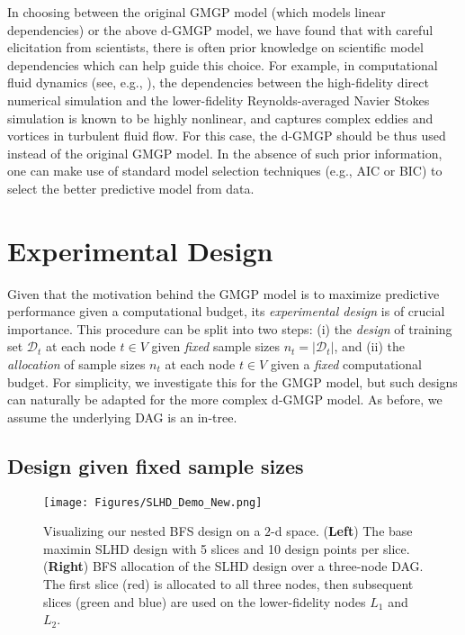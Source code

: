 \documentclass[12pt]{article}
\begin{document}
In choosing between the original GMGP model (which models linear dependencies) or the above d-GMGP model, we have found that with careful elicitation from scientists, there is often prior knowledge on scientific model dependencies which can help guide this choice. For example, in computational fluid dynamics (see, e.g., \citealp{wang2016swirling}), the dependencies between the high-fidelity direct numerical simulation \citep{pope2000turbulent} and the lower-fidelity Reynolds-averaged Navier Stokes simulation \citep{catalano2003evaluation} is known to be highly nonlinear, and captures complex eddies and vortices in turbulent fluid flow. For this case, the d-GMGP should be thus used instead of the original GMGP model. In the absence of such prior information, one can make use of standard model selection techniques (e.g., AIC or BIC) to select the better predictive model from data.

\section{Experimental Design}
\label{sec:Design}

Given that the motivation behind the GMGP model is to maximize predictive performance given a computational budget, its \textit{experimental design} is of crucial importance. This procedure can be split into two steps: (i) the \textit{design} of training set $\mathcal{D}_t$ at each node $t \in V$ given \textit{fixed} sample sizes $n_t = |\mathcal{D}_t|$, and (ii) the \textit{allocation} of sample sizes $n_t$ at each node $t \in V$ given a \textit{fixed} computational budget. For simplicity, we investigate this for the GMGP model, but such designs can naturally be adapted for the more complex d-GMGP model. As before, we assume the underlying DAG is an in-tree.

\subsection{Design given fixed sample sizes}
\label{sec:bfs}

\begin{figure}[!t]
    \centering
    \texttt{[image: Figures/SLHD\_Demo\_New.png]}
    \caption{Visualizing our nested BFS design on a $2$-d space. (\textbf{Left}) The base maximin SLHD design with 5 slices and 10 design points per slice. (\textbf{Right}) BFS allocation of the SLHD design over a three-node DAG. The first slice (red) is allocated to all three nodes, then subsequent slices (green and blue) are used on the lower-fidelity nodes $L_1$ and $L_2$.}
    \label{fig:BFSN}
\end{figure}
\end{document}
